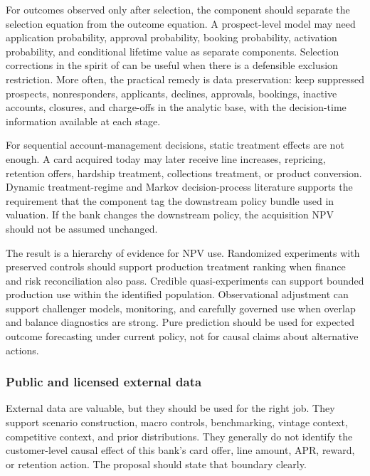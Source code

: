 \documentclass[11pt]{article}
\newcommand{\1}{\mathbf{1}}
\begin{document}
For outcomes observed only after selection, the component should separate the
selection equation from the outcome equation. A prospect-level model may need
application probability, approval probability, booking probability, activation
probability, and conditional lifetime value as separate components. Selection
corrections in the spirit of \citet{heckman1979selection} can be useful when
there is a defensible exclusion restriction. More often, the practical remedy
is data preservation: keep suppressed prospects, nonresponders, applicants,
declines, approvals, bookings, inactive accounts, closures, and charge-offs in
the analytic base, with the decision-time information available at each stage.

For sequential account-management decisions, static treatment effects are not
enough. A card acquired today may later receive line increases, repricing,
retention offers, hardship treatment, collections treatment, or product
conversion. Dynamic treatment-regime and Markov decision-process literature
\citep{murphy2003dynamic,puterman1994mdp} supports the requirement that the
component tag the downstream policy bundle used in valuation. If the bank
changes the downstream policy, the acquisition NPV should not be assumed
unchanged.

The result is a hierarchy of evidence for NPV use. Randomized experiments with
preserved controls should support production treatment ranking when finance
and risk reconciliation also pass. Credible quasi-experiments can support
bounded production use within the identified population. Observational
adjustment can support challenger models, monitoring, and carefully governed
use when overlap and balance diagnostics are strong. Pure prediction should be
used for expected outcome forecasting under current policy, not for causal
claims about alternative actions.

\subsubsection{Public and licensed external data}

External data are valuable, but they should be used for the right job. They
support scenario construction, macro controls, benchmarking, vintage context,
competitive context, and prior distributions. They generally do not identify
the customer-level causal effect of this bank's card offer, line amount, APR,
reward, or retention action. The proposal should state that boundary clearly.
\end{document}
